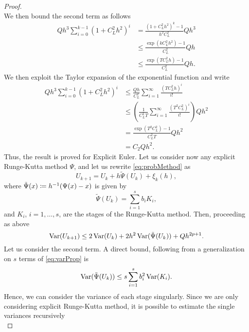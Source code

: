 \begin{proof}
\begin{equation}
\end{equation}
We then bound the second term as follows
\begin{equation}\label{eq:boundOfSum}
\begin{aligned}
	Q h^3 \sum_{i = 0}^{k - 1}(1 + C_L^2h^2)^i &=  \frac{(1 + C_L^2h^2)^k - 1}{h^2C_L^2}Qh^3 \\
	&\leq  \frac{\exp(kC_L^2h^2) - 1}{C_L^2}Qh \\ 
	&\leq  \frac{\exp(TC_L^2h) - 1}{C_L^2}Qh.
\end{aligned}
\end{equation}
We then exploit the Taylor expansion of the exponential function and write
\begin{equation}
\begin{aligned}
	Qh^3 \sum_{i = 0}^{k - 1}(1 + C_L^2h^2)^i &\leq \frac{Qh}{C_L^2} \sum_{i = 1}^{\infty} \frac{(TC_L^2h)^i}{i!} \\
	&\leq \left(\frac{1}{C_L^2T} \sum_{i = 1}^{\infty} \frac{(T^2C_L^2)^i}{i!}\right)Q h^2 \\
	&= \frac{\exp(T^2C_L^2) - 1}{C_L^2T} Q h^2 \\
	&= C_2 Q h^2.
\end{aligned}
\end{equation}
Thus, the result is proved for Explicit Euler. Let us consider now any explicit Runge-Kutta method $\Psi$, and let us rewrite \eqref{eq:probMethod} as
\begin{equation}
	U_{k+1} = U_k + h\tilde \Psi (U_k) + \xi_k(h),
\end{equation}
where $\tilde\Psi(x) \coloneqq h^{-1}(\Psi(x) - x)$ is given by
\begin{equation}
	\tilde\Psi(U_k) = \sum_{i = 1}^{s} b_i K_i,
\end{equation} 
and $K_i$, $i = 1, \ldots, s$, are the stages of the Runge-Kutta method. Then, proceeding as above
\begin{equation}
	\operatorname{Var}(U_{k+1}) \leq 2\operatorname{Var}(U_k) + 2h^2 \operatorname{Var}(\tilde \Psi (U_k)) + Q h^{2p + 1}.
\end{equation}
Let us consider the second term. A direct bound, following from a generalization on $s$ terms of \eqref{eq:varProp} is
\begin{equation}\label{eq:temp}
	\operatorname{Var}(\tilde \Psi (U_k)) \leq s\sum_{i = 1}^{s} b_i^2 \operatorname{Var}(K_i).
\end{equation}
Hence, we can consider the variance of each stage singularly. Since we are only considering explicit Runge-Kutta method, it is possible to estimate the single variances recursively
\begin{equation}

\end{equation}
\end{proof}
